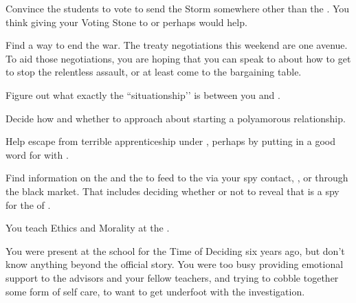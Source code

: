 \documentclass[char]{GL2020}
\begin{document}
{\begin{itemz}
    \item Convince the students to vote to send the Storm somewhere other than the \pShip{}.  You think giving your Voting Stone to \cWarlordDaughter{} or perhaps \cScholarship{} would help.
    \item Find a way to end the war. The treaty negotiations this weekend are one avenue. To aid those negotiations, you are hoping that you can speak to \cWarlordDaughter{} about how to get \cLoud{} to stop the relentless \pShip{} assault, or at least come to the bargaining table.
    \item Figure out what exactly the ``situationship’’ is between you and \cJuniorStatesman{}.
    \item Decide how and whether to approach \cBeetle{} about starting a polyamorous relationship.
    \item Help \cScholarship{} escape from \cScholarship{\their} terrible apprenticeship under \cAntiChup{}, perhaps by putting in a good word for \cScholarship{\them} with \cBeetle{}.
    \item Find information on the \pFarm{} and the \pTech{} to feed to the \pShip{} via your spy contact, \cBunker{}, or through the black market. That includes deciding whether or not to reveal that \cHistory{} is a spy for the \cQueen{\Monarch} of \pFarm{}.
\end{itemz}

\begin{itemz}[Notes]
    \item You teach Ethics and Morality at the \pSchool{}.
    \item You were present at the school for the Time of Deciding six years ago, but don't know anything beyond the official story. You were too busy providing emotional support to the advisors and your fellow teachers, and trying to cobble together some form of self care, to want to get underfoot with the investigation.
\end{itemz}

}
\end{document}
